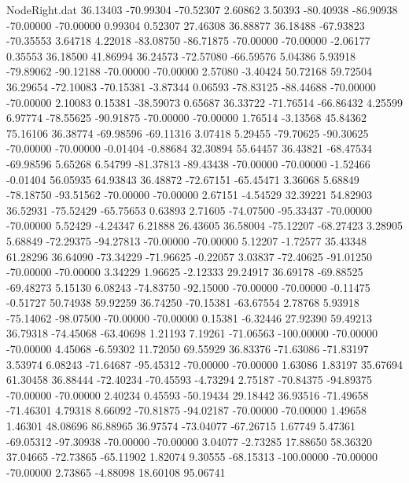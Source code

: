 \begin{filecontents}{NodeRight.dat}
  36.13403  -70.99304  -70.52307     2.60862    3.50393  -80.40938  -86.90938  -70.00000  -70.00000    0.99304    0.52307   27.46308   36.88877
  36.18488  -67.93823  -70.35553     3.64718    4.22018  -83.08750  -86.71875  -70.00000  -70.00000   -2.06177    0.35553   36.18500   41.86994
  36.24573  -72.57080  -66.59576     5.04386    5.93918  -79.89062  -90.12188  -70.00000  -70.00000    2.57080   -3.40424   50.72168   59.72504
  36.29654  -72.10083  -70.15381    -3.87344    0.06593  -78.83125  -88.44688  -70.00000  -70.00000    2.10083    0.15381  -38.59073    0.65687
  36.33722  -71.76514  -66.86432     4.25599    6.97774  -78.55625  -90.91875  -70.00000  -70.00000    1.76514   -3.13568   45.84362   75.16106
  36.38774  -69.98596  -69.11316     3.07418    5.29455  -79.70625  -90.30625  -70.00000  -70.00000   -0.01404   -0.88684   32.30894   55.64457
  36.43821  -68.47534  -69.98596     5.65268    6.54799  -81.37813  -89.43438  -70.00000  -70.00000   -1.52466   -0.01404   56.05935   64.93843
  36.48872  -72.67151  -65.45471     3.36068    5.68849  -78.18750  -93.51562  -70.00000  -70.00000    2.67151   -4.54529   32.39221   54.82903
  36.52931  -75.52429  -65.75653     0.63893    2.71605  -74.07500  -95.33437  -70.00000  -70.00000    5.52429   -4.24347    6.21888   26.43605
  36.58004  -75.12207  -68.27423     3.28905    5.68849  -72.29375  -94.27813  -70.00000  -70.00000    5.12207   -1.72577   35.43348   61.28296
  36.64090  -73.34229  -71.96625    -0.22057    3.03837  -72.40625  -91.01250  -70.00000  -70.00000    3.34229    1.96625   -2.12333   29.24917
  36.69178  -69.88525  -69.48273     5.15130    6.08243  -74.83750  -92.15000  -70.00000  -70.00000   -0.11475   -0.51727   50.74938   59.92259
  36.74250  -70.15381  -63.67554     2.78768    5.93918  -75.14062  -98.07500  -70.00000  -70.00000    0.15381   -6.32446   27.92390   59.49213
  36.79318  -74.45068  -63.40698     1.21193    7.19261  -71.06563 -100.00000  -70.00000  -70.00000    4.45068   -6.59302   11.72050   69.55929
  36.83376  -71.63086  -71.83197     3.53974    6.08243  -71.64687  -95.45312  -70.00000  -70.00000    1.63086    1.83197   35.67694   61.30458
  36.88444  -72.40234  -70.45593    -4.73294    2.75187  -70.84375  -94.89375  -70.00000  -70.00000    2.40234    0.45593  -50.19434   29.18442
  36.93516  -71.49658  -71.46301     4.79318    8.66092  -70.81875  -94.02187  -70.00000  -70.00000    1.49658    1.46301   48.08696   86.88965
  36.97574  -73.04077  -67.26715     1.67749    5.47361  -69.05312  -97.30938  -70.00000  -70.00000    3.04077   -2.73285   17.88650   58.36320
  37.04665  -72.73865  -65.11902     1.82074    9.30555  -68.15313 -100.00000  -70.00000  -70.00000    2.73865   -4.88098   18.60108   95.06741

\end{filecontents}

